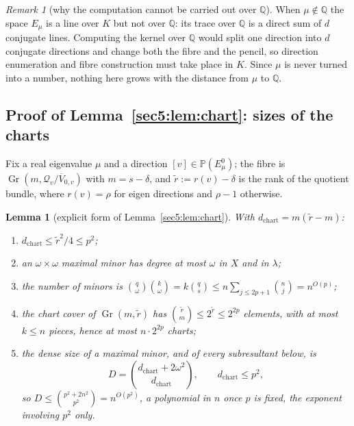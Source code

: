 \documentclass[journal]{IEEEtran}
\theoremstyle{plainn}
\newtheorem{lem}[thm]{Lemma}
\theoremstyle{remark}
\newtheorem{remark}{Remark}
\newcommand{\Gr}{\operatorname{Gr}}
\begin{document}
\begin{remark}[why the computation cannot be carried out over $\mathbb{Q}$]\label{appBC:rem:mustK}
When $\mu\notin\mathbb{Q}$ the space $E_\mu$ is a line over $K$ but not over $\mathbb{Q}$: its trace
over $\mathbb{Q}$ is a direct sum of $d$ conjugate lines. Computing the kernel over $\mathbb{Q}$ would
split one direction into $d$ conjugate directions and change both the fibre and the pencil, so
direction enumeration and fibre construction must take place in $K$. Since $\mu$ is never turned into a
number, nothing here grows with the distance from $\mu$ to $\mathbb{Q}$.
\end{remark}

\subsection{Proof of Lemma~\ref{sec5:lem:chart}: sizes of the charts}\label{appBC:sub:chart}

Fix a real eigenvalue $\mu$ and a direction $[v]\in\mathbb{P}(E_\mu^0)$; the fibre is
$\Gr(m,\mathcal{Q}_v/\overline{V}_{0,v})$ with $m=s-\delta$, and $\widetilde r:=r(v)-\delta$ is the
rank of the quotient bundle, where $r(v)=\rho$ for eigen directions and $\rho-1$ otherwise.

\begin{lem}[explicit form of Lemma~\ref{sec5:lem:chart}]\label{appBC:lem:chart}\label{appBC:rem:poly}
With $d_{\mathrm{chart}}=m(\widetilde r-m)$:
\begin{enumerate}[label=(\roman*),leftmargin=*]
\item $d_{\mathrm{chart}}\le\widetilde r^{2}/4\le p^{2}$;
\item an $\omega\times\omega$ maximal minor has degree at most $\omega$ in $X$ and in $\lambda$;
\item the number of minors is
$\binom q\omega\binom k\omega=k\binom qs\le n\sum_{j\le2p+1}\binom nj=n^{O(p)}$;
\item the chart cover of $\Gr(m,\widetilde r)$ has $\binom{\widetilde r}{m}\le2^{\widetilde r}\le2^{2p}$
elements, with at most $k\le n$ pieces, hence at most $n\cdot2^{2p}$ charts;
\item the dense size of a maximal minor, and of every subresultant below, is
\begin{equation}\label{appBC:eq:denseminor}
D=\binom{d_{\mathrm{chart}}+2\omega^{2}}{d_{\mathrm{chart}}},\qquad d_{\mathrm{chart}}\le p^{2},
\end{equation}
so $D\le\binom{p^{2}+2n^{2}}{p^{2}}=n^{O(p^{2})}$, a polynomial in $n$ once $p$ is fixed, the exponent
involving $p^{2}$ only.
\end{enumerate}
\end{lem}
\end{document}
